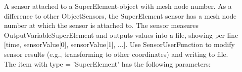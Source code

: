 \label{sec:item:SensorSuperElement}
A sensor attached to a SuperElement-object with mesh node number. As a difference to other ObjectSensors, the SuperElement sensor has a mesh node number at which the sensor is attached to. The sensor measures OutputVariableSuperElement and outputs values into a file, showing per line [time, sensorValue[0], sensorValue[1], ...]. Use SensorUserFunction to modify sensor results (e.g., transforming to other coordinates) and writing to file.
\vspace{12pt}\\
\vspace{12pt} \noindent 
The item  with type = 'SuperElement' has the following parameters:
\vspace{-0.5cm}\\
\vspace{-0.5cm}\\
